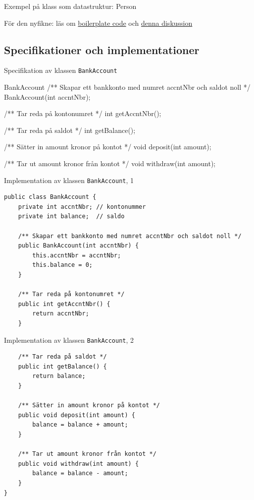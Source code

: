 \documentclass{lecturenotes}
\begin{document}
\begin{Slide}{Exempel på klass som datastruktur: Person}

\scriptsize För den nyfikne: läs om \href{https://en.wikipedia.org/wiki/Boilerplate_code}{boilerplate code} och \href{http://programmers.stackexchange.com/questions/30297/is-there-any-reason-to-use-plain-old-data-classes}{denna diskussion}
\end{Slide}

\subsection{Specifikationer och implementationer}

\begin{Slide}{Specifikation av klassen \texttt{BankAccount}}
\begin{ClassSpec}{BankAccount}
/** Skapar ett bankkonto med numret accntNbr och
    saldot noll */
BankAccount(int accntNbr); 

/** Tar reda på kontonumret */
int getAccntNbr();

/** Tar reda på saldot */
int getBalance();

/** Sätter in amount kronor på kontot */
void deposit(int amount);

/** Tar ut amount kronor från kontot */
void withdraw(int amount);
\end{ClassSpec}
\end{Slide}

\begin{Slide}{Implementation av klassen \texttt{BankAccount}, 1}
\begin{lstlisting}
public class BankAccount {
    private int accntNbr; // kontonummer
    private int balance;  // saldo

    /** Skapar ett bankkonto med numret accntNbr och saldot noll */
    public BankAccount(int accntNbr) {
        this.accntNbr = accntNbr;
        this.balance = 0;
    }

    /** Tar reda på kontonumret */
    public int getAccntNbr() {
        return accntNbr;
    }
\end{lstlisting}
\end{Slide}

\begin{Slide}{Implementation av klassen \texttt{BankAccount}, 2}
\begin{lstlisting}
    /** Tar reda på saldot */
    public int getBalance() {
        return balance;
    }

    /** Sätter in amount kronor på kontot */
    public void deposit(int amount) {
        balance = balance + amount;
    }
    
    /** Tar ut amount kronor från kontot */
    public void withdraw(int amount) {
        balance = balance - amount;
    }
}
\end{lstlisting}
\end{Slide}
\end{document}
